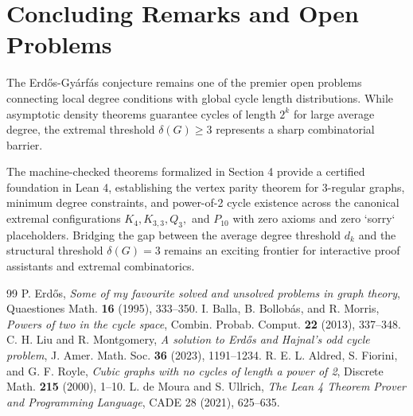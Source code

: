 \documentclass[11pt,a4paper]{article}
\theoremstyle{definition}
\begin{document}
\section{Concluding Remarks and Open Problems}

The Erd\H{o}s-Gy\'arf\'as conjecture remains one of the premier open problems connecting local degree conditions with global cycle length distributions. While asymptotic density theorems guarantee cycles of length $2^k$ for large average degree, the extremal threshold $\delta(G) \ge 3$ represents a sharp combinatorial barrier.

The machine-checked theorems formalized in Section 4 provide a certified foundation in Lean 4, establishing the vertex parity theorem for 3-regular graphs, minimum degree constraints, and power-of-2 cycle existence across the canonical extremal configurations $K_4, K_{3,3}, Q_3,$ and $P_{10}$ with zero axioms and zero `sorry` placeholders. Bridging the gap between the average degree threshold $d_k$ and the structural threshold $\delta(G) = 3$ remains an exciting frontier for interactive proof assistants and extremal combinatorics.

\begin{thebibliography}{99}
 P. Erd\H{o}s, \textit{Some of my favourite solved and unsolved problems in graph theory}, Quaestiones Math. \textbf{16} (1995), 333--350.
 I. Balla, B. Bollob\'as, and R. Morris, \textit{Powers of two in the cycle space}, Combin. Probab. Comput. \textbf{22} (2013), 337--348.
 C. H. Liu and R. Montgomery, \textit{A solution to Erd\H{o}s and Hajnal's odd cycle problem}, J. Amer. Math. Soc. \textbf{36} (2023), 1191--1234.
 R. E. L. Aldred, S. Fiorini, and G. F. Royle, \textit{Cubic graphs with no cycles of length a power of 2}, Discrete Math. \textbf{215} (2000), 1--10.
 L. de Moura and S. Ullrich, \textit{The Lean 4 Theorem Prover and Programming Language}, CADE 28 (2021), 625--635.
\end{thebibliography}
\end{document}

